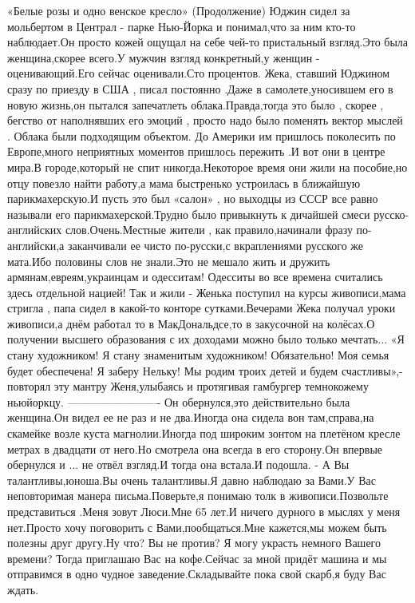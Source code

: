 «Белые розы и одно венское кресло»
(Продолжение)
Юджин сидел за мольбертом в Централ - парке Нью-Йорка и понимал,что за ним кто-то наблюдает.Он просто кожей ощущал на себе чей-то пристальный взгляд.Это была женщина,скорее всего.У мужчин взгляд конкретный,у женщин - оценивающий.Его сейчас оценивали.Сто процентов.
Жека, ставший Юджином сразу по приезду в США , писал постоянно .Даже в самолете,уносившем его в новую жизнь,он пытался запечатлеть облака.Правда,тогда это было , скорее , бегство от наполнявших его эмоций , просто надо было поменять вектор мыслей . Облака были подходящим объектом.
До Америки им пришлось поколесить по Европе,много неприятных моментов пришлось пережить .И вот они в центре мира.В городе,который не спит никогда.Некоторое время они жили на пособие,но отцу повезло найти работу,а мама быстренько устроилась в ближайшую парикмахерскую.И пусть это был «салон» , но выходцы из СССР все равно называли его парикмахерской.Трудно было привыкнуть к дичайшей смеси русско-английских слов.Очень.Местные жители , как правило,начинали фразу по-английски,а заканчивали ее  чисто по-русски,с вкраплениями русского же мата.Ибо половины слов не знали.Это не мешало жить и дружить армянам,евреям,украинцам и одесситам! Одесситы во все времена считались здесь отдельной нацией! 
Так и жили - Женька поступил на курсы живописи,мама стригла , папа сидел в какой-то конторе сутками.Вечерами Жека получал уроки живописи,а днём работал то в МакДональдсе,то в закусочной на колёсах.О получении высшего образования с их доходами можно было только мечтать...
«Я стану художником! Я стану знаменитым художником! Обязательно! Моя семья будет обеспечена! Я заберу Нельку! Мы родим троих детей и будем счастливы»,- повторял эту мантру Женя,улыбаясь и протягивая гамбургер темнокожему ньюйоркцу.
————————-
Он обернулся,это действительно была женщина.Он видел ее не раз и не два.Иногда она сидела вон там,справа,на скамейке возле куста магнолии.Иногда под широким зонтом на плетёном кресле метрах в двадцати от него.Но смотрела она всегда в его сторону.Он впервые обернулся и ... не отвёл взгляд.И тогда она встала.И подошла.
- А Вы талантливы,юноша.Вы очень талантливы.Я давно наблюдаю за Вами.У Вас неповторимая манера письма.Поверьте,я понимаю толк в живописи.Позвольте представиться .Меня зовут Люси.Мне 65 лет.И ничего дурного в мыслях у меня нет.Просто хочу поговорить с Вами,пообщаться.Мне кажется,мы можем быть полезны друг другу.Ну что? Вы не против? Я могу украсть немного Вашего времени? Тогда приглашаю Вас на кофе.Сейчас за мной придёт машина и мы отправимся в одно чудное заведение.Складывайте пока свой скарб,я буду Вас ждать.
